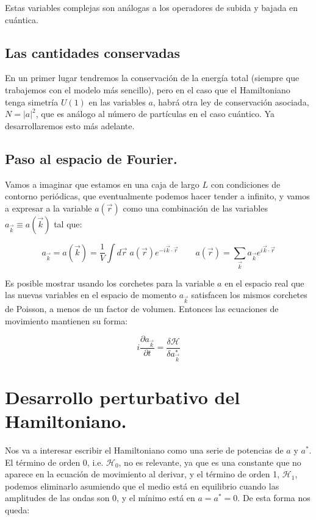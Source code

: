 Estas variables complejas son análogas a los operadores de subida y bajada en cuántica. 

\subsection*{Las cantidades conservadas}
En un primer lugar tendremos la conservación de la energía total (siempre que trabajemos con el modelo más sencillo), pero en el caso que el Hamiltoniano tenga simetría $U(1)$ en las variables $a$, habrá otra ley de conservación asociada, $N=|a|^2$, que es análogo al número de partículas en el caso cuántico. Ya desarrollaremos esto más adelante. 

\subsection*{Paso al espacio de Fourier.}
Vamos a imaginar que estamos en una caja de largo $L$ con condiciones de contorno periódicas, que eventualmente podemos hacer tender a infinito, y vamos a expresar a la variable $a(\vec r)$ como una combinación de las variables $a_{\vec k} \equiv a(\vec k)$ tal que:

\begin{equation}
	a_{\vec k} = a(\vec k) = \frac{1}{V}\int d\vec r\;a(\vec r)e^{-i\vec k\cdot\vec r} \qquad a(\vec r) = \sum_{\vec k} a_{\vec k} e^{i\vec k\cdot\vec r}
\end{equation}

Es posible mostrar usando los corchetes para la variable $a$ en el espacio real que las nuevas variables en el espacio de momento $a_{\vec k}$ satisfacen los mismos corchetes de Poisson, a menos de un factor de volumen. Entonces las ecuaciones de movimiento mantienen su forma:

\begin{equation}
	i\frac{\partial a_{\vec k}}{\partial t} = \frac{\delta \mathcal{H}}{\delta a_{\vec k}^*}
\end{equation}


\section{Desarrollo perturbativo del Hamiltoniano.}
Nos va a interesar escribir el Hamiltoniano como una serie de potencias de $a$ y $a^*$. El término de orden 0, i.e. $\mathcal{H}_0$, no es relevante, ya que es una constante que no aparece en la ecuación de movimiento al derivar, y el término de orden 1, $\mathcal{H}_1$, podemos eliminarlo asumiendo que el medio está en equilibrio cuando las amplitudes de las ondas son 0, y el mínimo está en $a=a^*=0$. De esta forma nos queda:

